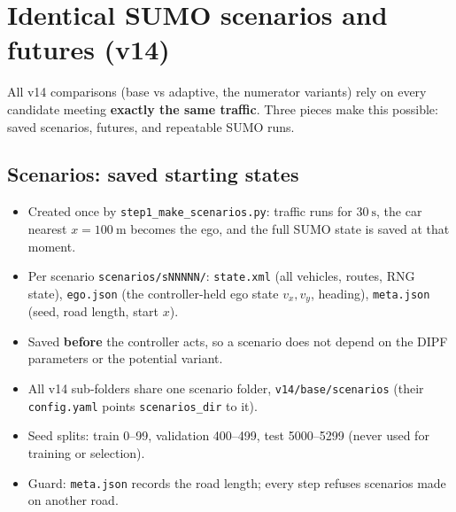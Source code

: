 \documentclass[11pt,a4paper]{article}
\begin{document}
\section{Identical SUMO scenarios and futures (v14)}\label{sec:identical}
All v14 comparisons (base vs adaptive, the numerator variants) rely on every candidate meeting
\textbf{exactly the same traffic}. Three pieces make this possible: saved scenarios, futures, and
repeatable SUMO runs.

\subsection{Scenarios: saved starting states}
\begin{itemize}
  \item Created once by \texttt{step1\_make\_scenarios.py}: traffic runs for $30~\mathrm{s}$, the car nearest
        $x = 100~\mathrm{m}$ becomes the ego, and the full SUMO state is saved at that moment.
  \item Per scenario \texttt{scenarios/sNNNNN/}: \texttt{state.xml} (all vehicles, routes, RNG state),
        \texttt{ego.json} (the controller-held ego state $v_x, v_y$, heading), \texttt{meta.json} (seed, road length, start $x$).
  \item Saved \textbf{before} the controller acts, so a scenario does not depend on the DIPF parameters or the
        potential variant.
  \item All v14 sub-folders share one scenario folder, \texttt{v14/base/scenarios}
        (their \texttt{config.yaml} points \texttt{scenarios\_dir} to it).
  \item Seed splits: train 0--99, validation 400--499, test 5000--5299 (never used for training or selection).
  \item Guard: \texttt{meta.json} records the road length; every step refuses scenarios made on another road.
\end{itemize}

\end{document}
